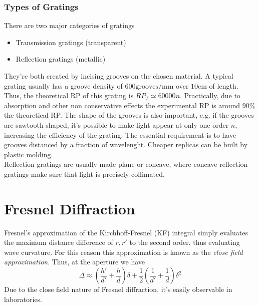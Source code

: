 \documentclass[../electromagnetism.tex]{subfiles}
\begin{document}
\subsubsection{Types of Gratings}
There are two major categories of gratings
\begin{itemize}
\item Transmission gratings (transparent)
\item Reflection gratings (metallic)
\end{itemize}
They're both created by incising grooves on the chosen material. A typical grating usually has a groove density of $600\mathrm{grooves/mm}$ over $10$cm of length. Thus, the theoretical RP of this grating is $RP_T\simeq60000 n$. Practically, due to absorption and other non conservative effects the experimental RP is around $90\%$ the theoretical RP. The shape of the grooves is also important, e.g. if the grooves are sawtooth shaped, it's possible to make light appear at only one order $n$, increasing the efficiency of the grating. The essential requirement is to have grooves distanced by a fraction of wavelenght. Cheaper replicas can be built by plastic molding.\\
Reflection gratings are usually made plane or concave, where concave reflection gratings make sure that light is precisely collimated.
\section{Fresnel Diffraction}
Fresnel's approximation of the Kirchhoff-Fresnel (KF) integral simply evaluates the maximum distance difference of $r, r'$ to the second order, thus evaluating wave curvature. For this reason this approximation is known as the \textit{close field approximation}. Thus, at the aperture we have
\begin{equation}
	\Delta\approx\left( \frac{h'}{d'}+\frac{h}{d} \right)\delta+\frac{1}{2}\left( \frac{1}{d'}+\frac{1}{d} \right)\delta^2
	\label{eq:fresnelapprox.diff}
\end{equation}
Due to the close field nature of Fresnel diffraction, it's easily observable in laboratories.
\end{document}
